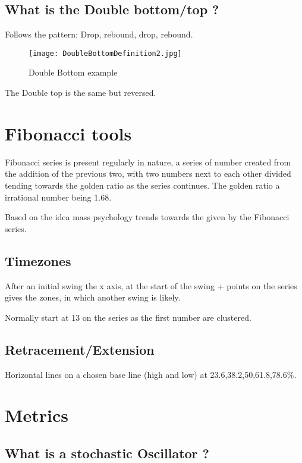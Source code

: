 \documentclass[11pt]{scrartcl} %
\begin{document}
\subsection{What is the Double bottom/top ?}

Follows the pattern: Drop, rebound, drop, rebound.

\begin{figure}[h] %
	\centering
	\texttt{[image: DoubleBottomDefinition2.jpg]} %
	\caption{Double Bottom example}
\end{figure}

The Double top is the same but reversed.

\section{Fibonacci tools}

Fibonacci series is present regularly in nature, a series of number created from the addition of the
previous two, with two numbers next to each other divided tending towards the golden ratio as the 
series continues. The golden ratio a irrational number being 1.68.

Based on the idea mass psychology trends towards the given by the Fibonacci series.

\subsection{Timezones}

After an initial swing the x axis, at the start of the swing + points on the series gives the zones,
in which another swing is likely.

Normally start at 13 on the series as the first number are clustered.

\subsection{Retracement/Extension}

Horizontal lines on a chosen base line (high and low) at 23.6,38.2,50,61.8,78.6\%.

\section{Metrics}

\subsection{What is a stochastic Oscillator ?}
\end{document}
